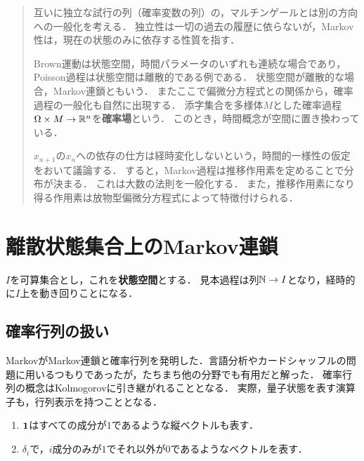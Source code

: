 \documentclass[uplatex,dvipdfmx]{jsreport}
\begin{document}
\begin{quotation}
    互いに独立な試行の列（確率変数の列）の，マルチンゲールとは別の方向への一般化を考える．
    独立性は一切の過去の履歴に依らないが，Markov性は，現在の状態のみに依存する性質を指す．

    Brown運動は状態空間，時間パラメータのいずれも連続な場合であり，Poisson過程は状態空間は離散的である例である．
    状態空間が離散的な場合，Markov連鎖ともいう．
    またここで偏微分方程式との関係から，確率過程の一般化も自然に出現する．
    添字集合を多様体$M$とした確率過程$\Omega\times M\to\mathbb{R}^n$を\textbf{確率場}という．
    このとき，時間概念が空間に置き換わっている．

    $x_{n+1}$の$x_n$への依存の仕方は経時変化しないという，時間的一様性の仮定をおいて議論する．
    すると，Markov過程は推移作用素を定めることで分布が決まる．
    これは大数の法則を一般化する．
    また，推移作用素になり得る作用素は放物型偏微分方程式によって特徴付けられる．
\end{quotation}

\section{離散状態集合上のMarkov連鎖}

\begin{notation}
    $I$を可算集合とし，これを\textbf{状態空間}とする．
    見本過程は列$\mathbb{N}\to I$となり，経時的に$I$上を動き回りことになる．
\end{notation}

\subsection{確率行列の扱い}

\begin{history}
    MarkovがMarkov連鎖と確率行列を発明した．言語分析やカードシャッフルの問題に用いるつもりであったが，たちまち他の分野でも有用だと解った．
    確率行列の概念はKolmogorovに引き継がれることとなる．
    実際，量子状態を表す演算子も，行列表示を持つこととなる．
\end{history}

\begin{notation}\mbox{}
    \begin{enumerate}
        \item $\mathbf{1}$はすべての成分が$1$であるような縦ベクトルも表す．
        \item $\delta_i$で，$i$成分のみが$1$でそれ以外が$0$であるようなベクトルを表す．
    \end{enumerate}
\end{notation}
\end{document}

